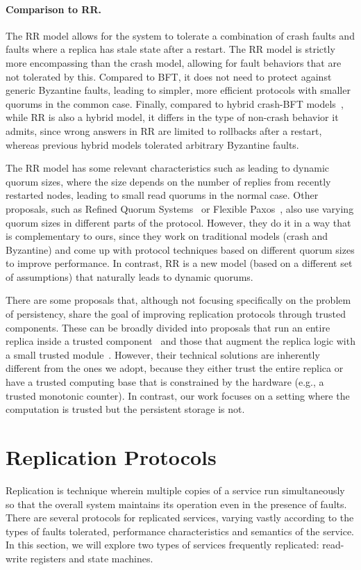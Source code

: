 \paragraph{Comparison to \ac{RR}.}
The \ac{RR} model allows for the system to tolerate a combination of
crash faults and faults where a replica has stale state after a
restart. The \ac{RR} model is strictly more encompassing than
the crash model, allowing for fault behaviors that are
not tolerated by this. Compared to \ac{BFT}, it does not need to
protect against generic Byzantine faults, leading to simpler,
more efficient protocols with smaller quorums in the common case.
Finally, compared to hybrid crash-\ac{BFT}
models~\cite{MeyerPradhan91,bc:hybrid,mc:hybrid,upright}, while
\ac{RR} is also a hybrid model, it differs in the type of
non-crash behavior it admits, since wrong answers in \ac{RR}
are limited to rollbacks after a restart, whereas previous hybrid
models tolerated arbitrary Byzantine faults.

The \ac{RR} model has some relevant characteristics such as
leading to dynamic quorum sizes, where the size depends on the
number of replies from recently restarted nodes, leading to small
read quorums in the normal case. Other proposals, such as Refined
Quorum Systems~\cite{rqs} or Flexible Paxos~\cite{fp},  also use
varying quorum sizes in different parts of the protocol. However,
they do it in a way that is complementary to ours, since they
work on traditional models (crash and Byzantine) and come up with
protocol techniques based on different quorum sizes to improve
performance. In contrast, \ac{RR} is a new model (based on a
different set of assumptions) that naturally leads to dynamic
quorums.


There are some proposals that, although not focusing specifically
on the problem of persistency, share the goal of improving replication
protocols through trusted components. These can be broadly divided into
proposals that run an entire replica inside a trusted
component~\cite{p2p-sgx,bft-sgx} and those that augment the replica logic with a
small trusted module~\cite{a2m,trinc}.  However, their technical solutions are
inherently different from the ones we adopt, because they either
trust the entire replica or have a trusted computing base that is
constrained by the hardware (e.g., a trusted monotonic counter).
In contrast, our work focuses on a setting where the computation is
trusted but the persistent storage is not.

\section{Replication Protocols}
Replication is technique wherein multiple copies of a service run
simultaneously so that the overall system maintains its operation
even in the presence of faults. There are several protocols for
replicated services, varying vastly according to the types of
faults tolerated, performance characteristics and semantics of
the service. In this section, we will explore two types of
services frequently replicated: read-write registers and state
machines.

